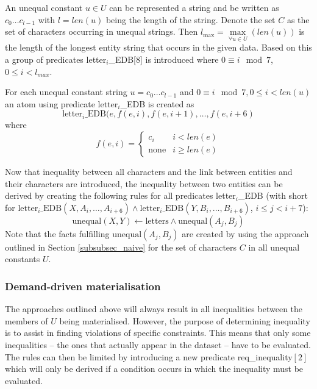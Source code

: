 \documentclass[hyperref,bachelorofscience,fleqn]{cgvpub}
\begin{document}
An unequal constant \(u \in U\) can be represented a string and be written as \(c_0 \ldots c_{l - 1}\) with \(l = len(u)\) being the length of the string. Denote the set \(C\) as the set of characters occurring in unequal strings. Then \(l_{\max} = \max\limits_{\forall u \in U}(len(u))\) is the length of the longest entity string that occurs in the given data.
Based on this a group of predicates letter\(_i\)\_EDB[8] is introduced where \(0 \equiv i \mod 7\), \(0 \leq i < l_{max} \). 

For each unequal constant string \(u = c_0 \ldots c_{l - 1}\) and \(0 \equiv i \mod 7, 0 \leq i < len(u)\) an atom using predicate letter\(_i\)\_EDB is created as 
\begin{equation*}
\text{letter}_i\text{\_EDB}(e, f(e, i), f(e, i+1), \ldots, f(e, i+6)
\end{equation*}where
\begin{equation*}
f(e, i) = 
\begin{cases}
      c_i & i < len(e) \\
      \text{none} & i \geq len(e)
\end{cases}
\end{equation*}

Now that inequality between all characters and the link between entities and their characters are introduced, the inequality between two entities can be derived by creating the following rules for all predicates letter\(_i\)\_EDB (with  short for \(\text{letter}_i\text{\_EDB}(X, A_i, \ldots, A_{i+6}) \wedge\text{letter}_i\text{\_EDB}(Y, B_i, \ldots, B_{i+6})\), \(i \leq j < i + 7\)):
\begin{equation*}
\text{unequal}(X, Y) \leftarrow \text{letters} \wedge \text{unequal}(A_j, B_j)
\end{equation*}
Note that the facts fulfilling \(\text{unequal}(A_j, B_j)\) are created by using the approach outlined in Section \ref{subsubsec_naive} for the set of characters \(C\) in all unequal constants \(U\).	

\subsubsection{Demand-driven materialisation}
The approaches outlined above will always result in all inequalities between the members of \(U\) being materialised. However, the purpose of determining inequality is to assist in finding violations of specific constraints. This means that only some inequalities -- the ones that actually appear in the dataset -- have to be evaluated. The rules can then be limited by introducing a new predicate req\_inequality\([2]\) which will only be derived if a condition occurs in which the inequality must be evaluated.\\
\end{document}
